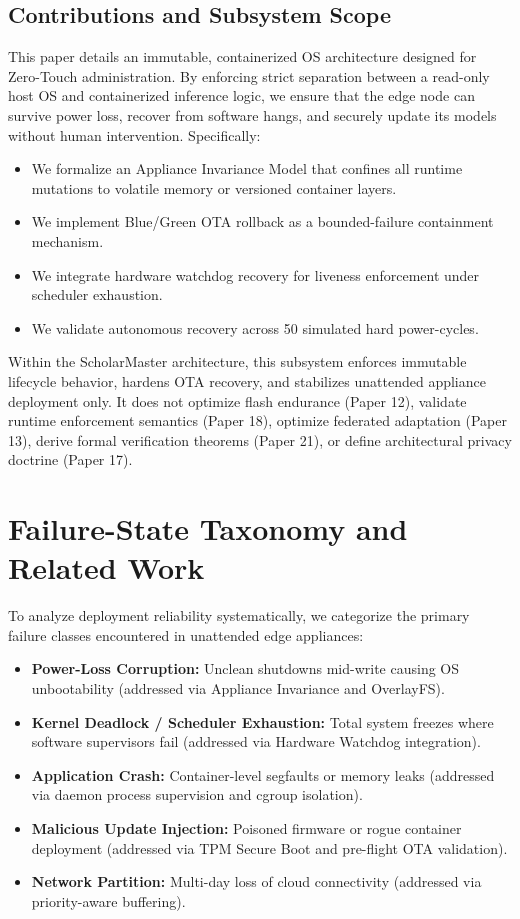 \documentclass[conference]{IEEEtran}
\begin{document}
\subsection{Contributions and Subsystem Scope}
This paper details an immutable, containerized OS architecture designed for Zero-Touch administration. By enforcing strict separation between a read-only host OS and containerized inference logic, we ensure that the edge node can survive power loss, recover from software hangs, and securely update its models without human intervention. Specifically:
\begin{itemize}
    \item We formalize an Appliance Invariance Model that confines all runtime mutations to volatile memory or versioned container layers.
    \item We implement Blue/Green OTA rollback as a bounded-failure containment mechanism.
    \item We integrate hardware watchdog recovery for liveness enforcement under scheduler exhaustion.
    \item We validate autonomous recovery across 50 simulated hard power-cycles.
\end{itemize}

Within the ScholarMaster architecture, this subsystem enforces immutable lifecycle behavior, hardens OTA recovery, and stabilizes unattended appliance deployment only. It does not optimize flash endurance (Paper 12), validate runtime enforcement semantics (Paper 18), optimize federated adaptation (Paper 13), derive formal verification theorems (Paper 21), or define architectural privacy doctrine (Paper 17).

\section{Failure-State Taxonomy and Related Work}

To analyze deployment reliability systematically, we categorize the primary failure classes encountered in unattended edge appliances:
\begin{itemize}
    \item \textbf{Power-Loss Corruption:} Unclean shutdowns mid-write causing OS unbootability (addressed via Appliance Invariance and OverlayFS).
    \item \textbf{Kernel Deadlock / Scheduler Exhaustion:} Total system freezes where software supervisors fail (addressed via Hardware Watchdog integration).
    \item \textbf{Application Crash:} Container-level segfaults or memory leaks (addressed via daemon process supervision and cgroup isolation).
    \item \textbf{Malicious Update Injection:} Poisoned firmware or rogue container deployment (addressed via TPM Secure Boot and pre-flight OTA validation).
    \item \textbf{Network Partition:} Multi-day loss of cloud connectivity (addressed via priority-aware buffering).
\end{itemize}
\end{document}
